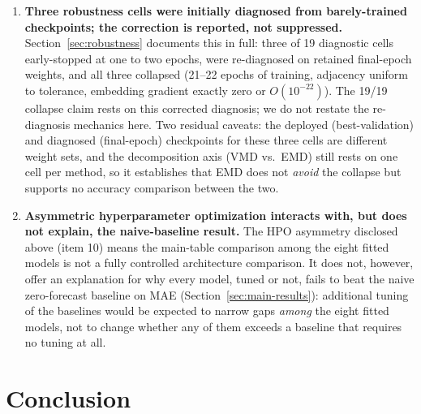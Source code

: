 \documentclass[journal]{IEEEtran}
\begin{document}
\begin{enumerate}
    \item \textbf{Three robustness cells were initially diagnosed from barely-trained checkpoints; the correction is reported, not suppressed.} Section~\ref{sec:robustness} documents this in full: three of 19 diagnostic cells early-stopped at one to two epochs, were re-diagnosed on retained final-epoch weights, and all three collapsed (21--22 epochs of training, adjacency uniform to tolerance, embedding gradient exactly zero or $O(10^{-22})$). The 19/19 collapse claim rests on this corrected diagnosis; we do not restate the re-diagnosis mechanics here. Two residual caveats: the deployed (best-validation) and diagnosed (final-epoch) checkpoints for these three cells are different weight sets, and the decomposition axis (VMD vs.\ EMD) still rests on one cell per method, so it establishes that EMD does not \emph{avoid} the collapse but supports no accuracy comparison between the two.
    \item \textbf{Asymmetric hyperparameter optimization interacts with, but does not explain, the naive-baseline result.} The HPO asymmetry disclosed above (item 10) means the main-table comparison among the eight fitted models is not a fully controlled architecture comparison. It does not, however, offer an explanation for why every model, tuned or not, fails to beat the naive zero-forecast baseline on MAE (Section~\ref{sec:main-results}): additional tuning of the baselines would be expected to narrow gaps \emph{among} the eight fitted models, not to change whether any of them exceeds a baseline that requires no tuning at all.
\end{enumerate}

\section{Conclusion}
\label{sec:conclusion}
\end{document}
